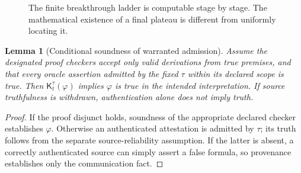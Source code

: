 \documentclass[11pt,letterpaper]{article}
\newtheorem{lemma}[theorem]{Lemma}
\theoremstyle{definition}
\theoremstyle{remark}
\begin{document}
\begin{figure}[htbp]
\centering
{}
\caption{The finite breakthrough ladder is computable stage by stage. The mathematical existence of a final plateau is different from uniformly locating it.}
\end{figure}
\begin{lemma}[Conditional soundness of warranted admission]
Assume the designated proof checkers accept only valid derivations from true premises, and that every oracle assertion admitted by the fixed $\tau$ within its declared scope is true. Then $\mathsf K_t^{\tau}(\varphi)$ implies $\varphi$ is true in the intended interpretation. If source truthfulness is withdrawn, authentication alone does not imply truth.
\end{lemma}
\begin{proof}
If the proof disjunct holds, soundness of the appropriate declared checker establishes $\varphi$. Otherwise an authenticated attestation is admitted by $\tau$; its truth follows from the separate source-reliability assumption. If the latter is absent, a correctly authenticated source can simply assert a false formula, so provenance establishes only the communication fact.
\end{proof}
\end{document}
